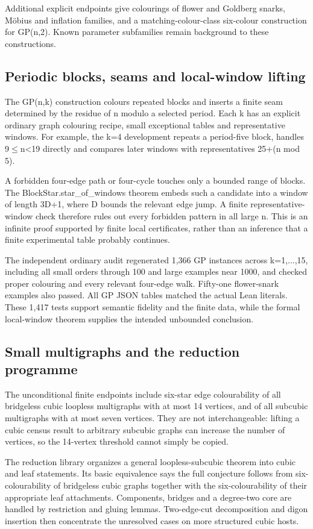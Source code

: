 \documentclass[11pt,a4paper]{article}
\begin{document}
Additional explicit endpoints give colourings of flower and Goldberg snarks, Möbius and inflation families, and a matching-colour-class six-colour construction for GP(n,2). Known parameter subfamilies remain background to these constructions.

\subsection{Periodic blocks, seams and local-window lifting}
The GP(n,k) construction colours repeated blocks and inserts a finite seam determined by the residue of n modulo a selected period. Each k has an explicit ordinary graph colouring recipe, small exceptional tables and representative windows. For example, the k=4 development repeats a period-five block, handles 9\ensuremath{\leq}n<19 directly and compares later windows with representatives 25+(n mod 5).

A forbidden four-edge path or four-cycle touches only a bounded range of blocks. The BlockStar.star\_of\_windows theorem embeds such a candidate into a window of length 3D+1, where D bounds the relevant edge jump. A finite representative-window check therefore rules out every forbidden pattern in all large n. This is an infinite proof supported by finite local certificates, rather than an inference that a finite experimental table probably continues.

The independent ordinary audit regenerated 1,366 GP instances across k=1,...,15, including all small orders through 100 and large examples near 1000, and checked proper colouring and every relevant four-edge walk. Fifty-one flower-snark examples also passed. All GP JSON tables matched the actual Lean literals. These 1,417 tests support semantic fidelity and the finite data, while the formal local-window theorem supplies the intended unbounded conclusion.

\subsection{Small multigraphs and the reduction programme}
The unconditional finite endpoints include six-star edge colourability of all bridgeless cubic loopless multigraphs with at most 14 vertices, and of all subcubic multigraphs with at most seven vertices. They are not interchangeable: lifting a cubic census result to arbitrary subcubic graphs can increase the number of vertices, so the 14-vertex threshold cannot simply be copied.

The reduction library organizes a general loopless-subcubic theorem into cubic and leaf statements. Its basic equivalence says the full conjecture follows from six-colourability of bridgeless cubic graphs together with the six-colourability of their appropriate leaf attachments. Components, bridges and a degree-two core are handled by restriction and gluing lemmas. Two-edge-cut decomposition and digon insertion then concentrate the unresolved cases on more structured cubic hosts.
\end{document}
